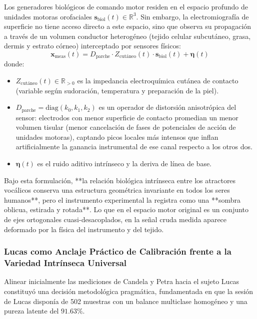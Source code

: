 \documentclass[11pt,a4paper,openany]{book}
\theoremstyle{definition}
\begin{document}
Los generadores biológicos de comando motor residen en el espacio profundo de unidades motoras orofaciales $\mathbf{s}_{\text{biol}}(t) \in \mathbb{R}^3$. Sin embargo, la electromiografía de superficie no tiene acceso directo a este espacio, sino que observa su propagación a través de un volumen conductor heterogéneo (tejido celular subcutáneo, grasa, dermis y estrato córneo) interceptado por sensores físicos:
\begin{equation}
\mathbf{x}_{\text{meas}}(t) = D_{\text{parche}} \cdot Z_{\text{cutáneo}}(t) \cdot \mathbf{s}_{\text{biol}}(t) + \boldsymbol{\eta}(t)
\end{equation}
donde:
\begin{itemize}
    \item $Z_{\text{cutáneo}}(t) \in \mathbb{R}_{>0}$ es la impedancia electroquímica cutánea de contacto (variable según sudoración, temperatura y preparación de la piel).
    \item $D_{\text{parche}} = \text{diag}(k_0, k_1, k_2)$ es un operador de distorsión anisotrópica del sensor: electrodos con menor superficie de contacto promedian un menor volumen tisular (menor cancelación de fases de potenciales de acción de unidades motoras), captando picos locales más intensos que inflan artificialmente la ganancia instrumental de ese canal respecto a los otros dos.
    \item $\boldsymbol{\eta}(t)$ es el ruido aditivo intrínseco y la deriva de línea de base.
\end{itemize}

Bajo esta formulación, **la relación biológica intrínseca entre los atractores vocálicos conserva una estructura geométrica invariante en todos los seres humanos**, pero el instrumento experimental la registra como una **sombra oblicua, estirada y rotada**. Lo que en el espacio motor original es un conjunto de ejes ortogonales cuasi-desacoplados, en la señal cruda medida aparece deformado por la física del instrumento y del tejido.

\subsubsection{Lucas como Anclaje Práctico de Calibración frente a la Variedad Intrínseca Universal}
\label{subsubsec:lucas_anclaje_practico}

Alinear inicialmente las mediciones de Candela y Petra hacia el sujeto Lucas constituyó una decisión metodológica pragmática, fundamentada en que la sesión de Lucas disponía de 502 muestras con un balance multiclase homogéneo y una pureza latente del $91.63\%$. 
\end{document}
